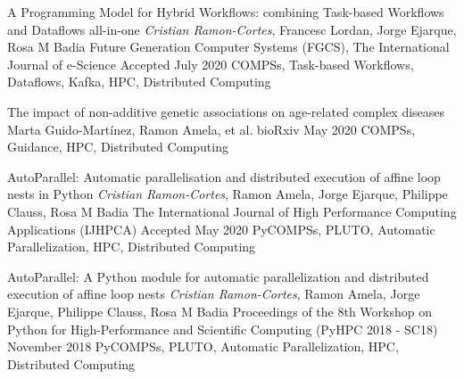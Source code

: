 %
%
%

\newpage


\begin{publications}
    
    \publication
        {A Programming Model for Hybrid Workflows: combining Task-based Workflows and Dataflows all-in-one}
        {\textit{Cristian Ramon-Cortes}, Francesc Lordan, Jorge Ejarque, Rosa M Badia}
        {Future Generation Computer Systems (FGCS), The International Journal of e-Science}
        {Accepted July 2020}
        {COMPSs, Task-based Workflows, Dataflows, Kafka, HPC, Distributed Computing}
        {}

    \publication
        {The impact of non-additive genetic associations on age-related complex diseases}
        {Marta Guido-Martínez, Ramon Amela, et al.}
        {bioRxiv}
        {May 2020}
        {COMPSs, Guidance, HPC, Distributed Computing}
        {}

    \publication
        {AutoParallel: Automatic parallelisation and distributed execution of affine loop nests in Python}
        {\textit{Cristian Ramon-Cortes}, Ramon Amela, Jorge Ejarque, Philippe Clauss, Rosa M Badia}
        {The International Journal of High Performance Computing Applications (IJHPCA)}
        {Accepted May 2020}
        {PyCOMPSs, PLUTO, Automatic Parallelization, HPC, Distributed Computing}
        {}
    
    \publication
        {AutoParallel: A Python module for automatic parallelization and distributed execution of affine loop nests}
        {\textit{Cristian Ramon-Cortes}, Ramon Amela, Jorge Ejarque, Philippe Clauss, Rosa M Badia}
        {Proceedings of the 8th Workshop on Python for High-Performance and Scientific Computing (PyHPC 2018 - SC18)}
        {November 2018}
        {PyCOMPSs, PLUTO, Automatic Parallelization, HPC, Distributed Computing}
        {}
        

\end{publications}
